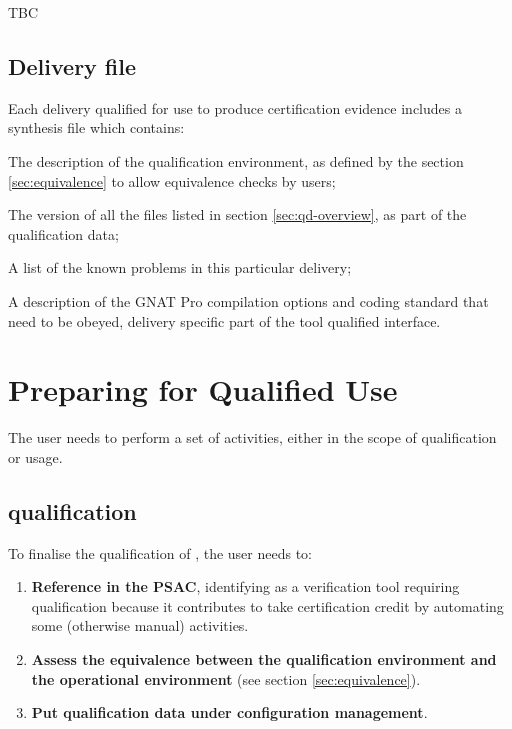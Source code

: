 \documentclass {report}
\begin{document}
TBC

\section{Delivery file}
\label{sec:delivery}

Each delivery qualified for use to produce certification evidence includes a
 synthesis file which contains:

\begin{Itemize} 
\item%
  The description of the qualification environment, as defined by the section
  \ref{sec:equivalence} to allow equivalence checks by users;
\item%
  The version of all the files listed in section \ref{sec:qd-overview}, as
  part of the qualification data;
\item%
  A list of the known problems in this particular delivery;
\item%
  A description of the GNAT Pro compilation options and coding standard that
  need to be obeyed, delivery specific part of the tool qualified interface.
\end{Itemize}

\chapter{Preparing for Qualified Use}

The user needs to perform a set of activities, either in the scope of \xcov{}
qualification or \xcov{} usage.

\section{\xcov{} qualification}

To finalise the qualification of \xcov{}, the user needs to:

\begin{enumerate}
%
\item \textbf{Reference \xcov{} in the PSAC}, identifying \xcov{} as a
  verification tool requiring qualification because it contributes to take
  certification credit by automating some (otherwise manual) activities.
%
\item \textbf{Assess the equivalence between the qualification environment and
  the operational environment} (see section \ref{sec:equivalence}).
%
\item \textbf{Put qualification data under configuration management}.
\end{enumerate}
\end{document}
